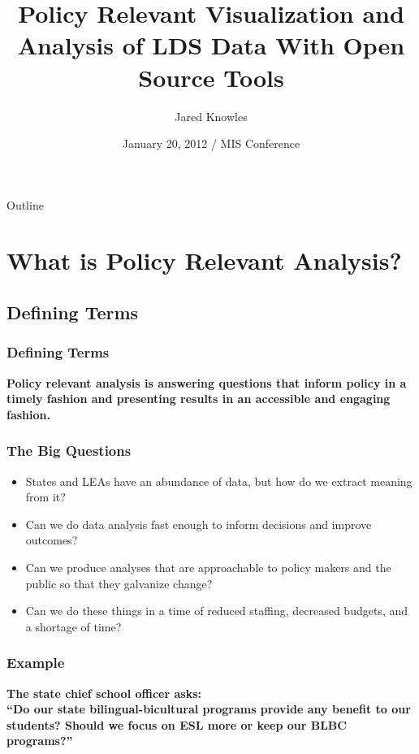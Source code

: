 \documentclass[12pt,handout]{beamer}
\title{Policy Relevant Visualization and Analysis of LDS Data With Open Source Tools}
\author{Jared Knowles}
\institute[DPI] %
{
  Policy Research Advisor\\
  Wisconsin Department of Public Instruction
}
\date[MIS] %
{January 20, 2012 / MIS Conference}
\begin{document}
\begin{frame}
  \titlepage
\end{frame}


\begin{frame}{Outline}
  \tableofcontents
\end{frame}


\section{What is Policy Relevant Analysis?}
\label{sec:pol-rel-analysis}

\subsection{Defining Terms}

\begin{frame}
\frametitle{Defining Terms}
\Large \textbf{Policy relevant analysis is answering questions that inform policy in a timely fashion and presenting results in an accessible and engaging fashion.}
\end{frame}

\begin{frame}
\frametitle{The Big Questions}
  \begin{itemize}
  \item States and LEAs have an abundance of data, but how do 
  we extract meaning from it?
  \item Can we do data analysis fast enough to inform decisions and improve 
  outcomes?
  \item Can we produce analyses that are approachable to policy makers and the public so that they galvanize change?
  \item Can we do these things in a time of reduced staffing, decreased 
  budgets, and a shortage of time?
  \end{itemize}
\end{frame}

\begin{frame}
\frametitle{Example}
\begin{center}
\textbf{The state chief school officer asks: \\ 
``Do our state bilingual-bicultural programs provide any benefit to our students? Should we focus on ESL more or keep our BLBC programs?''}
\end{center}
\end{frame}
\end{document}
